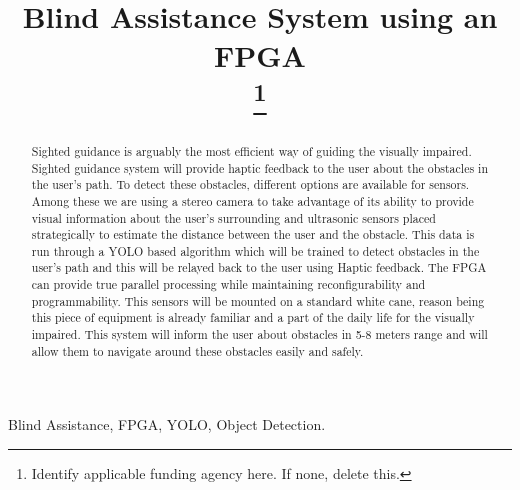 \documentclass[conference]{IEEEtran}
\begin{document}
\title{Blind Assistance System using an FPGA\\
\thanks{Identify applicable funding agency here. If none, delete this.}
}

\author{
\and
{}
\and
{}
}

\maketitle

\begin{abstract}
Sighted guidance is arguably the most efficient way of guiding the
visually impaired. Sighted guidance system will provide haptic
feedback to the user about the obstacles in the user's path. To detect
these obstacles, different options are available for sensors. Among
these we are using a stereo camera to take advantage of its ability to
provide visual information about the user's surrounding and ultrasonic sensors placed strategically to estimate the distance between the user and the obstacle. This data is run
through a YOLO based algorithm which will be trained to detect
obstacles in the user's path and this will be relayed back to the user
using Haptic feedback. The FPGA can provide true parallel processing while maintaining
reconfigurability and programmability. This sensors will be mounted
on a standard white cane, reason being this piece of equipment is
already familiar and a part of the daily life for the visually impaired. This system will inform the user about obstacles in 5-8
meters range and will allow them to navigate around these obstacles
easily and safely.
\end{abstract}

\begin{IEEEkeywords}
Blind Assistance, FPGA, YOLO, Object Detection.
\end{IEEEkeywords} 
\end{document}
